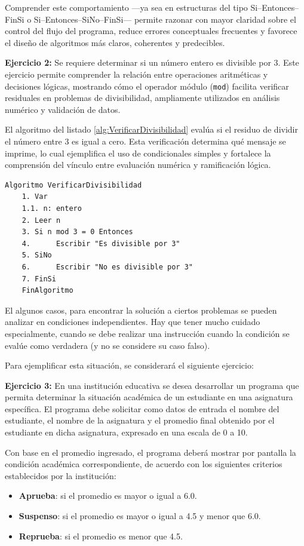 \documentclass[12pt,twoside]{book}
\begin{document}
						Comprender este comportamiento —ya sea en estructuras del tipo Si–Entonces–FinSi o Si–Entonces–SiNo–FinSi— permite razonar con mayor claridad sobre el control del flujo del programa, reduce errores conceptuales frecuentes y favorece el diseño de algoritmos más claros, coherentes y predecibles. 
						
						\textbf{Ejercicio 2:} Se requiere determinar si un número entero es divisible por 3. Este ejercicio permite comprender la relación entre operaciones aritméticas y decisiones lógicas, mostrando cómo el operador módulo (\texttt{mod}) facilita verificar residuales en problemas de divisibilidad, ampliamente utilizados en análisis numérico y validación de datos.
						
						El algoritmo del listado \ref{alg:VerificarDivisibilidad} evalúa si el residuo de dividir el número entre 3 es igual a cero. Esta verificación determina qué mensaje se imprime, lo cual ejemplifica el uso de condicionales simples y fortalece la comprensión del vínculo entre evaluación numérica y ramificación lógica.
						
						\begin{lstlisting}[style=upsamStyle,caption={Verificación de divisibilidad},label={alg:VerificarDivisibilidad}]
	Algoritmo VerificarDivisibilidad
	1. Var
	1.1. n: entero
	2. Leer n
	3. Si n mod 3 = 0 Entonces
	4. 		Escribir "Es divisible por 3"
	5. SiNo
	6. 		Escribir "No es divisible por 3"
	7. FinSi
	FinAlgoritmo \end{lstlisting}
						\noindent
						El algunos casos, para encontrar la solución a ciertos problemas se pueden analizar en condiciones independientes. Hay que tener mucho cuidado especialmente, cuando se debe realizar una instrucción cuando la condición se evalúe como verdadera (y no se considere su caso falso). 
						
						Para ejemplificar esta situación, se considerará el siguiente ejercicio:
						
						\textbf{Ejercicio 3:}  
						En una institución educativa se desea desarrollar un programa que permita determinar la situación académica de un estudiante en una asignatura específica. El programa debe solicitar como datos de entrada el nombre del estudiante, el nombre de la asignatura y el promedio final obtenido por el estudiante en dicha asignatura, expresado en una escala de 0 a 10.
						
						Con base en el promedio ingresado, el programa deberá mostrar por pantalla la condición académica correspondiente, de acuerdo con los siguientes criterios establecidos por la institución:
						\begin{itemize}
							\item \textbf{Aprueba}: si el promedio es mayor o igual a 6.0.
							\item \textbf{Suspenso}: si el promedio es mayor o igual a 4.5 y menor que 6.0.
							\item \textbf{Reprueba}: si el promedio es menor que 4.5.
						\end{itemize}
						
\end{document}
